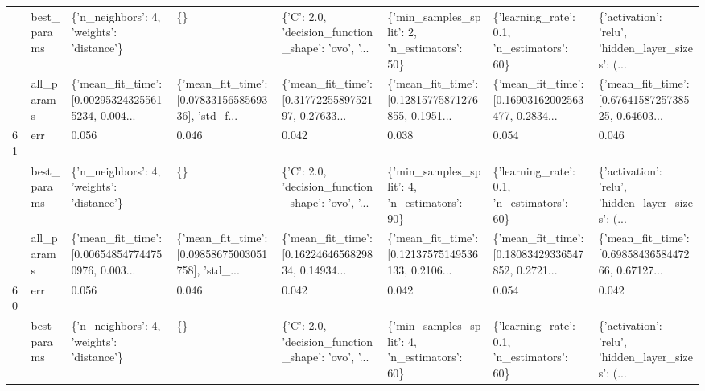 \begin{tabular}{llllllll}
   & best\_params &          \{'n\_neighbors': 4, 'weights': 'distance'\} &                                                 \{\} &  \{'C': 2.0, 'decision\_function\_shape': 'ovo', '... &       \{'min\_samples\_split': 2, 'n\_estimators': 50\} &         \{'learning\_rate': 0.1, 'n\_estimators': 60\} &  \{'activation': 'relu', 'hidden\_layer\_sizes': (... \\
   & all\_params &  \{'mean\_fit\_time': [0.002953243255615234, 0.004... &  \{'mean\_fit\_time': [0.0783315658569336], 'std\_f... &  \{'mean\_fit\_time': [0.3177225589752197, 0.27633... &  \{'mean\_fit\_time': [0.12815775871276855, 0.1951... &  \{'mean\_fit\_time': [0.16903162002563477, 0.2834... &  \{'mean\_fit\_time': [0.6764158725738525, 0.64603... \\
61 & err &                                              0.056 &                                              0.046 &                                              0.042 &                                              0.038 &                                              0.054 &                                              0.046 \\
   & best\_params &          \{'n\_neighbors': 4, 'weights': 'distance'\} &                                                 \{\} &  \{'C': 2.0, 'decision\_function\_shape': 'ovo', '... &       \{'min\_samples\_split': 4, 'n\_estimators': 90\} &         \{'learning\_rate': 0.1, 'n\_estimators': 60\} &  \{'activation': 'relu', 'hidden\_layer\_sizes': (... \\
   & all\_params &  \{'mean\_fit\_time': [0.006548547744750976, 0.003... &  \{'mean\_fit\_time': [0.09858675003051758], 'std\_... &  \{'mean\_fit\_time': [0.1622464656829834, 0.14934... &  \{'mean\_fit\_time': [0.12137575149536133, 0.2106... &  \{'mean\_fit\_time': [0.18083429336547852, 0.2721... &  \{'mean\_fit\_time': [0.6985843658447266, 0.67127... \\
60 & err &                                              0.056 &                                              0.046 &                                              0.042 &                                              0.042 &                                              0.054 &                                              0.042 \\
   & best\_params &          \{'n\_neighbors': 4, 'weights': 'distance'\} &                                                 \{\} &  \{'C': 2.0, 'decision\_function\_shape': 'ovo', '... &       \{'min\_samples\_split': 4, 'n\_estimators': 60\} &         \{'learning\_rate': 0.1, 'n\_estimators': 60\} &  \{'activation': 'relu', 'hidden\_layer\_sizes': (... \\

\end{tabular}
